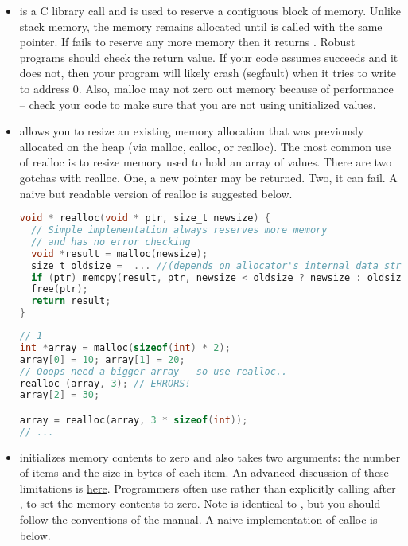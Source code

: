 \begin{itemize}
\item {} is a C library call and is used to reserve a contiguous block of memory. Unlike stack memory, the memory remains allocated until  is called with the same pointer. If  fails to reserve any more memory then it returns . Robust programs should check the return value. If your code assumes  succeeds and it does not, then your program will likely crash (segfault) when it tries to write to address 0. Also, malloc may not zero out memory because of performance -- check your code to make sure that you are not using unitialized values.
\item {} allows you to resize an existing memory allocation that was previously allocated on the heap (via malloc, calloc, or realloc). The most common use of realloc is to resize memory used to hold an array of values. There are two gotchas with realloc. One, a new pointer may be returned. Two, it can fail. A naive but readable version of realloc is suggested below. 

\begin{lstlisting}[language=C]
void * realloc(void * ptr, size_t newsize) {
  // Simple implementation always reserves more memory
  // and has no error checking
  void *result = malloc(newsize); 
  size_t oldsize =  ... //(depends on allocator's internal data structure)
  if (ptr) memcpy(result, ptr, newsize < oldsize ? newsize : oldsize);
  free(ptr);
  return result;
}
\end{lstlisting}

\begin{lstlisting}[language=C]
// 1
int *array = malloc(sizeof(int) * 2);
array[0] = 10; array[1] = 20;
// Ooops need a bigger array - so use realloc..
realloc (array, 3); // ERRORS!
array[2] = 30; 

array = realloc(array, 3 * sizeof(int));
// ...
\end{lstlisting}

\item {} initializes memory contents to zero and also takes two arguments: the number of items and the size in bytes of each item. An advanced discussion of these limitations is \href{http://locklessinc.com/articles/calloc/}{here}. Programmers often use  rather than explicitly calling  after , to set the memory contents to zero. Note  is identical to , but you should follow the conventions of the manual. A naive implementation of calloc is below.


\end{itemize}
